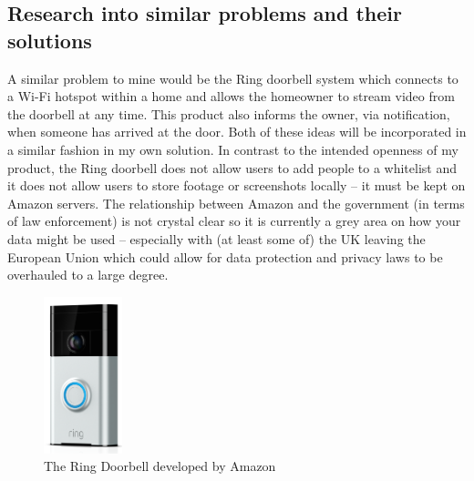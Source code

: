 \documentclass[9pt]{article}
\begin{document}
\subsection{Research into similar problems and their solutions}\label{sec_research}
A similar problem to mine would be the Ring doorbell system which connects to a Wi-Fi hotspot within a home and allows the homeowner to stream video from the doorbell at any time. This product also informs the owner, via notification, when someone has arrived at the door. Both of these ideas will be incorporated in a similar fashion in my own solution. In contrast to the intended openness of my product, the Ring doorbell does not allow users to add people to a whitelist and it does not allow users to store footage or screenshots locally – it must be kept on Amazon servers. The relationship between Amazon and the government (in terms of law enforcement) is not crystal clear so it is currently a grey area on how your data might be used – especially with (at least some of) the UK leaving the European Union which could allow for data protection and privacy laws to be overhauled to a large degree.
\begin{figure}[H]
	\centering
	\includegraphics[width=0.9in]{figs/ringDoorbell}
	\caption{The Ring Doorbell developed by Amazon}
	\label{fig:ringdoorbell}
\end{figure}
\end{document}
